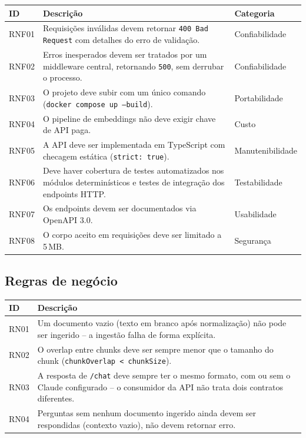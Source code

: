 \documentclass[11pt,a4paper]{article}
\begin{document}
\begin{longtable}{p{1.5cm}p{9.5cm}p{2cm}}
\toprule
\textbf{ID} & \textbf{Descrição} & \textbf{Categoria} \\
\midrule
\endhead
RNF01 & Requisições inválidas devem retornar \texttt{400 Bad Request} com detalhes
        do erro de validação. & Confiabilidade \\
RNF02 & Erros inesperados devem ser tratados por um middleware central, retornando
        \texttt{500}, sem derrubar o processo. & Confiabilidade \\
RNF03 & O projeto deve subir com um único comando
        (\texttt{docker compose up --build}). & Portabilidade \\
RNF04 & O pipeline de embeddings não deve exigir chave de API paga. & Custo \\
RNF05 & A API deve ser implementada em TypeScript com checagem estática
        (\texttt{strict: true}). & Manutenibilidade \\
RNF06 & Deve haver cobertura de testes automatizados nos módulos determinísticos e
        testes de integração dos endpoints HTTP. & Testabilidade \\
RNF07 & Os endpoints devem ser documentados via OpenAPI 3.0. & Usabilidade \\
RNF08 & O corpo aceito em requisições deve ser limitado a 5\,MB. & Segurança \\
\bottomrule
\end{longtable}

\subsection{Regras de negócio}

\begin{longtable}{p{1.5cm}p{11cm}}
\toprule
\textbf{ID} & \textbf{Descrição} \\
\midrule
\endhead
RN01 & Um documento vazio (texto em branco após normalização) não pode ser
        ingerido -- a ingestão falha de forma explícita. \\
RN02 & O overlap entre chunks deve ser sempre menor que o tamanho do chunk
        (\texttt{chunkOverlap < chunkSize}). \\
RN03 & A resposta de \texttt{/chat} deve sempre ter o mesmo formato, com ou sem o
        Claude configurado -- o consumidor da API não trata dois contratos
        diferentes. \\
RN04 & Perguntas sem nenhum documento ingerido ainda devem ser respondidas (contexto
        vazio), não devem retornar erro. \\
\bottomrule
\end{longtable}
\end{document}
